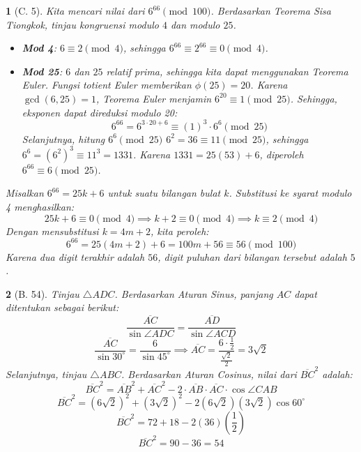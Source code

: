 \documentclass[11pt,a4paper,DIV=12]{scrartcl}
\theoremstyle{problemstyle}
\theoremstyle{answerstyle}
\newtheorem{answer}{}
\begin{document}
\begin{answer}[C. 5]
  Kita mencari nilai dari $6^{66} \pmod{100}$. Berdasarkan Teorema Sisa Tiongkok, tinjau kongruensi modulo $4$ dan modulo $25$.
  \begin{itemize}
    \item \textbf{Mod 4}: $6 \equiv 2 \pmod{4}$, sehingga $6^{66} \equiv 2^{66} \equiv 0 \pmod{4}$.
    \item \textbf{Mod 25}: $6$ dan $25$ relatif prima, sehingga kita dapat menggunakan Teorema Euler. Fungsi totient Euler memberikan $\phi(25) = 20$. Karena $\gcd(6, 25) = 1$, Teorema Euler menjamin $6^{20} \equiv 1 \pmod{25}$.
          Sehingga, eksponen dapat direduksi modulo 20:
          \[
            6^{66} = 6^{3 \cdot 20 + 6} \equiv (1)^3 \cdot 6^6 \pmod{25}
          \]
          Selanjutnya, hitung $6^6 \pmod{25}$ $6^2 = 36 \equiv 11 \pmod{25}$, sehingga $6^6 = (6^2)^3 \equiv 11^3 = 1331$. Karena $1331 = 25(53) + 6$, diperoleh $6^{66} \equiv 6 \pmod{25}$.
  \end{itemize}
  \noindent Misalkan $6^{66} = 25k + 6$ untuk suatu bilangan bulat $k$. Substitusi ke syarat modulo 4 menghasilkan:
  \[
    25k + 6 \equiv 0 \pmod{4} \implies k + 2 \equiv 0 \pmod{4} \implies k \equiv 2 \pmod{4}
  \]
  Dengan mensubstitusi $k = 4m + 2$, kita peroleh:
  \[
    6^{66} = 25(4m + 2) + 6 = 100m + 56 \equiv 56 \pmod{100}
  \]
  Karena dua digit terakhir adalah $56$, digit puluhan dari bilangan tersebut adalah $\boxed{5}$.
\end{answer}

\begin{answer}[B. 54]
  Tinjau $\triangle ADC$. Berdasarkan Aturan Sinus, panjang $AC$ dapat ditentukan sebagai berikut:
  \[
    \frac{\overline{AC}}{\sin \angle ADC} = \frac{\overline{AD}}{\sin \angle ACD}
  \]
  \[
    \frac{\overline{AC}}{\sin 30^\circ} = \frac{6}{\sin 45^\circ} \implies \overline{AC} = \frac{6 \cdot \frac{1}{2}}{\frac{\sqrt{2}}{2}} = 3\sqrt{2}
  \]
  Selanjutnya, tinjau $\triangle ABC$. Berdasarkan Aturan Cosinus, nilai dari $\overline{BC}^2$ adalah:
  \[
    \overline{BC}^2 = \overline{AB}^2 + \overline{AC}^2 - 2 \cdot \overline{AB} \cdot \overline{AC} \cdot \cos \angle CAB
  \]
  \[
    \overline{BC}^2 = (6\sqrt{2})^2 + (3\sqrt{2})^2 - 2(6\sqrt{2})(3\sqrt{2}) \cos 60^\circ
  \]
  \[
    \overline{BC}^2 = 72 + 18 - 2(36)\left(\frac{1}{2}\right)
  \]
  \[
    \overline{BC}^2 = 90 - 36 = \boxed{54}
  \]
\end{answer}
\end{document}
